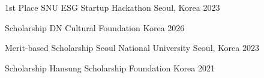 



\begin{cvhonors}

  \cvhonor
    {1st Place} %
    {SNU ESG Startup Hackathon} %
    {Seoul, Korea} %
    {2023} %

\end{cvhonors}




\begin{cvhonors}

  \cvhonor
    {Scholarship} %
    {DN Cultural Foundation} %
    {Korea} %
    {2026} %

  \cvhonor
    {Merit-based Scholarship} %
    {Seoul National University} %
    {Seoul, Korea} %
    {2023} %

  \cvhonor
    {Scholarship} %
    {Hansung Scholarship Foundation} %
    {Korea} %
    {2021} %

\end{cvhonors}
